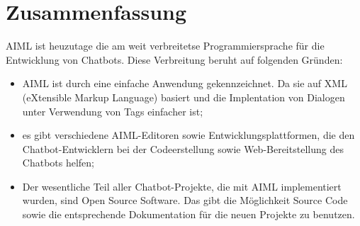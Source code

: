 \documentclass[9pt]{beamer}
\begin{document}
\section{Zusammenfassung}
\begin{frame}


AIML ist heuzutage die am weit verbreitetse Programmiersprache für die Entwicklung von Chatbots. Diese Verbreitung beruht auf folgenden Gründen:
\begin{itemize}
\item AIML ist durch eine einfache Anwendung gekennzeichnet. Da sie auf XML (eXtensible Markup Language) basiert und die Implentation von Dialogen unter Verwendung von Tags einfacher ist;
\item es gibt verschiedene AIML-Editoren sowie Entwicklungsplattformen, die den Chatbot-Entwicklern bei der Codeerstellung sowie Web-Bereitstellung des Chatbots helfen;
\item Der wesentliche Teil aller Chatbot-Projekte, die mit AIML implementiert wurden, sind Open Source Software. Das gibt die Möglichkeit Source Code sowie die entsprechende Dokumentation für die neuen Projekte zu benutzen.
\end{itemize}

\end{frame}
\end{document}
